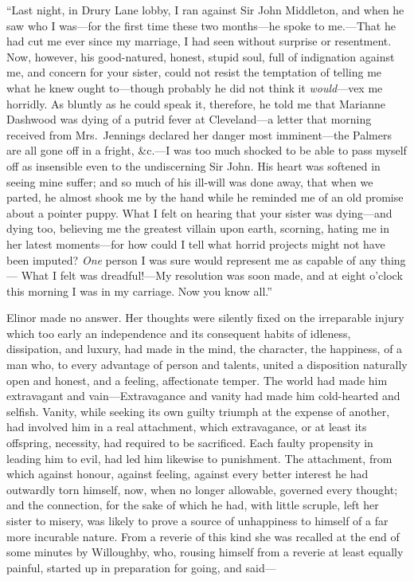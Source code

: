 \documentclass{article}
\begin{document}
``Last night, in Drury Lane lobby, I ran against Sir
John Middleton, and when he saw who I was---for the first
time these two months---he spoke to me.---That he had cut
me ever since my marriage, I had seen without surprise
or resentment.  Now, however, his good-natured, honest,
stupid soul, full of indignation against me, and concern
for your sister, could not resist the temptation of telling
me what he knew ought to---though probably he did not
think it \emph{would}---vex me horridly.  As bluntly as he could
speak it, therefore, he told me that Marianne Dashwood
was dying of a putrid fever at Cleveland---a letter that
morning received from Mrs.\ Jennings declared her danger
most imminent---the Palmers are all gone off in a fright,
\&c.---I was too much shocked to be able to pass myself
off as insensible even to the undiscerning Sir John.
His heart was softened in seeing mine suffer; and so much
of his ill-will was done away, that when we parted,
he almost shook me by the hand while he reminded me of an
old promise about a pointer puppy.  What I felt on hearing
that your sister was dying---and dying too, believing me
the greatest villain upon earth, scorning, hating me
in her latest moments---for how could I tell what horrid
projects might not have been imputed?  \emph{One} person I
was sure would represent me as capable of any thing---%
What I felt was dreadful!---My resolution was soon made,
and at eight o'clock this morning I was in my carriage.
Now you know all.''

Elinor made no answer.  Her thoughts were silently fixed
on the irreparable injury which too early an independence
and its consequent habits of idleness, dissipation, and luxury,
had made in the mind, the character, the happiness,
of a man who, to every advantage of person and talents,
united a disposition naturally open and honest, and a
feeling, affectionate temper.  The world had made him
extravagant and vain---Extravagance and vanity had made him
cold-hearted and selfish.  Vanity, while seeking its own
guilty triumph at the expense of another, had involved
him in a real attachment, which extravagance, or at least
its offspring, necessity, had required to be sacrificed.
Each faulty propensity in leading him to evil, had led
him likewise to punishment.  The attachment, from which
against honour, against feeling, against every better interest
he had outwardly torn himself, now, when no longer allowable,
governed every thought; and the connection, for the sake
of which he had, with little scruple, left her sister
to misery, was likely to prove a source of unhappiness
to himself of a far more incurable nature.  From a reverie
of this kind she was recalled at the end of some minutes
by Willoughby, who, rousing himself from a reverie at least
equally painful, started up in preparation for going, and said---%
\end{document}
